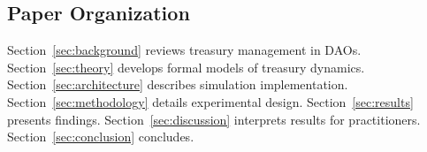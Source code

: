 \subsection{Paper Organization}

Section~\ref{sec:background} reviews treasury management in DAOs. Section~\ref{sec:theory} develops formal models of treasury dynamics. Section~\ref{sec:architecture} describes simulation implementation. Section~\ref{sec:methodology} details experimental design. Section~\ref{sec:results} presents findings. Section~\ref{sec:discussion} interprets results for practitioners. Section~\ref{sec:conclusion} concludes.
